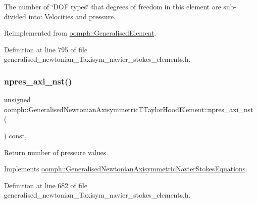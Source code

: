 The number of \char`\"{}\+D\+O\+F types\char`\"{} that degrees of freedom in this element are sub-\/divided into\+: Velocities and pressure. 



Reimplemented from \hyperlink{classoomph_1_1GeneralisedElement_a0c6037a870597b35dcf1c780710b9a56}{oomph\+::\+Generalised\+Element}.



Definition at line 795 of file generalised\+\_\+newtonian\+\_\+\+Taxisym\+\_\+navier\+\_\+stokes\+\_\+elements.\+h.

\mbox{\label{classoomph_1_1GeneralisedNewtonianAxisymmetricTTaylorHoodElement_adb127de036210e35b09096c7df88b4d5}} 
\subsubsection{\texorpdfstring{npres\+\_\+axi\+\_\+nst()}{npres\_axi\_nst()}}
{\footnotesize\ttfamily unsigned oomph\+::\+Generalised\+Newtonian\+Axisymmetric\+T\+Taylor\+Hood\+Element\+::npres\+\_\+axi\+\_\+nst (\begin{DoxyParamCaption}{ }\end{DoxyParamCaption}) const\hspace{0.3cm}{\ttfamily [inline]}, {\ttfamily [virtual]}}



Return number of pressure values. 



Implements \hyperlink{classoomph_1_1GeneralisedNewtonianAxisymmetricNavierStokesEquations_a4c4c6c5ae937187b735e79451a0befbc}{oomph\+::\+Generalised\+Newtonian\+Axisymmetric\+Navier\+Stokes\+Equations}.



Definition at line 682 of file generalised\+\_\+newtonian\+\_\+\+Taxisym\+\_\+navier\+\_\+stokes\+\_\+elements.\+h.

\mbox{\label{classoomph_1_1GeneralisedNewtonianAxisymmetricTTaylorHoodElement_adcb0106a988171745cb375a4ba11658e}} 
